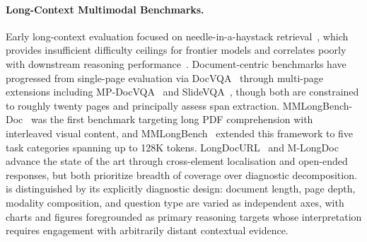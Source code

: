 \paragraph{Long-Context Multimodal Benchmarks.}
Early long-context evaluation focused on needle-in-a-haystack retrieval~\citep{wang2024mmniah}, which provides insufficient difficulty ceilings for frontier models and correlates poorly with downstream reasoning performance~\citep{wang2025mmlongbench}. Document-centric benchmarks have progressed from single-page evaluation via DocVQA~\citep{mathew2021docvqa} through multi-page extensions including MP-DocVQA~\citep{tito2023hierarchical} and SlideVQA~\citep{tanaka2023slidevqa}, though both are constrained to roughly twenty pages and principally assess span extraction. MMLongBench-Doc~\citep{ma2024mmlongbenchdoc} was the first benchmark targeting long PDF comprehension with interleaved visual content, and MMLongBench~\citep{wang2025mmlongbench} extended this framework to five task categories spanning up to 128K tokens. LongDocURL~\citep{deng2025longdocurl} and M-LongDoc~\citep{chia2024mlongdoc} advance the state of the art through cross-element localisation and open-ended responses, but both prioritize breadth of coverage over diagnostic decomposition. 
\synthdocbench{} is distinguished by its explicitly diagnostic design: document length, page depth, modality composition, and question type are varied as independent axes, with charts and figures foregrounded as primary reasoning targets whose interpretation requires engagement with arbitrarily distant contextual evidence.

